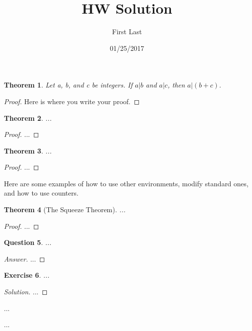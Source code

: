 \documentclass{article}
\title{HW Solution}
\author{First Last}
\date{01/25/2017}
\newtheorem{theorem}{Theorem}[section]
\newtheorem{exercise}[theorem]{Exercise}
\newtheorem{question}[theorem]{Question}
\newenvironment{definition}[1][Definition]
{
	\begin{trivlist}
		\item[\hskip \labelsep {\bfseries #1}]
	}
	{
	\end{trivlist}
}
\begin{document}
\maketitle
\linespread{2}
\setcounter{section}{1}
\setcounter{theorem}{0}

\begin{theorem}
Let a, b, and c be integers. If \(a|b\) and \(a|c\), then \(a|(b+c)\).
\end{theorem}

\begin{proof}
Here is where you write your proof.
\end{proof}

\begin{theorem}
...
\end{theorem}

\begin{proof}
...
\end{proof}

\begin{theorem}
...
\end{theorem}

\begin{proof}
...
\end{proof}

Here are some examples of how to use other environments, modify standard ones, and how to use counters.
\setcounter{section}{3}
\setcounter{theorem}{4}
\begin{theorem}[The Squeeze Theorem]
	...
\end{theorem}

\begin{proof}
	...
\end{proof}

\setcounter{section}{2}
\setcounter{theorem}{7}
\begin{question}
	...
\end{question}

\begin{proof}[Answer]
	...
\end{proof}


\setcounter{section}{6}
\setcounter{theorem}{1}
\begin{exercise}
	...
\end{exercise}

\begin{proof}[Solution]
	...
\end{proof}

\begin{definition}
	...
\end{definition}

\begin{definition}[Integers]
	...
\end{definition}
\end{document}
